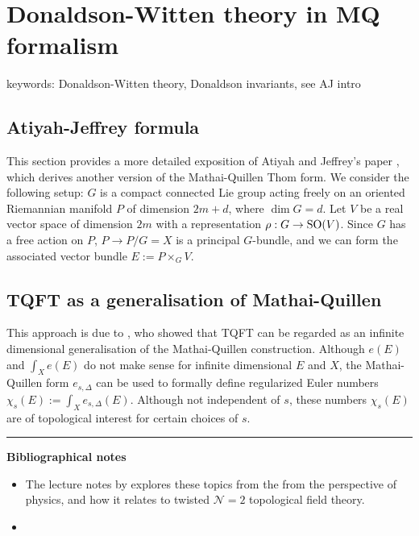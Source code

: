 \chapter{Donaldson-Witten theory in MQ formalism}
\label{chapter4}

keywords: Donaldson-Witten theory, Donaldson invariants, see AJ intro

\section{Atiyah-Jeffrey formula}
This section provides a more detailed exposition of Atiyah and Jeffrey's paper
\cite{atiyahlagrangians}, which derives another version of the Mathai-Quillen
Thom form. We consider the following setup: $G$ is a compact connected Lie group
acting freely on an oriented Riemannian manifold  $P$ of dimension  $2m+d$,
where  $\dim G = d$. Let  $V$ be a real vector space of dimension  $2m$  with a
representation $\rho : G \to \operatorname{SO}(V)$. Since  $G$ has a free action on  $P$, 
 $P\to P /G = X$ is a principal $G$-bundle, and we can form the associated
vector bundle $E:= P\times_G V$. 



\section{TQFT as a generalisation of Mathai-Quillen}
 This approach is
due to \citet{atiyahlagrangians}, who showed that TQFT can be regarded as an
infinite dimensional generalisation of the Mathai-Quillen construction. 
Although $e(E)$ and  $\int_X e(E)$ do not make sense for
infinite dimensional  $E$ and  $X$, the Mathai-Quillen form  $e_{s,\Delta}$ can
be used to formally define regularized Euler numbers $\chi_s(E) := \int_X
e_{s,\Delta}(E)$. Although not independent of $s$, these numbers  $\chi_s(E)$
are of topological interest for certain choices of  $s$.  


\vspace{5mm}
\hrule 
\vspace{5mm}

\textbf{Bibliographical notes}
{\small
\begin{itemize}
	\item The lecture notes by \citet{cordes95} explores these topics from the
	from the perspective of physics, and how it relates to twisted
	$\mathcal{N}=2$ topological field theory.
	\item 
\end{itemize}
}


